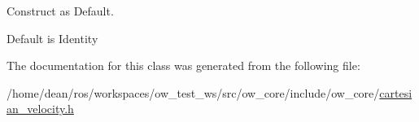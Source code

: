 Construct as Default. 

Default is Identity 

The documentation for this class was generated from the following file\+:\begin{DoxyCompactItemize}
\item 
/home/dean/ros/workspaces/ow\+\_\+test\+\_\+ws/src/ow\+\_\+core/include/ow\+\_\+core/\hyperlink{cartesian__velocity_8h}{cartesian\+\_\+velocity.\+h}\end{DoxyCompactItemize}
